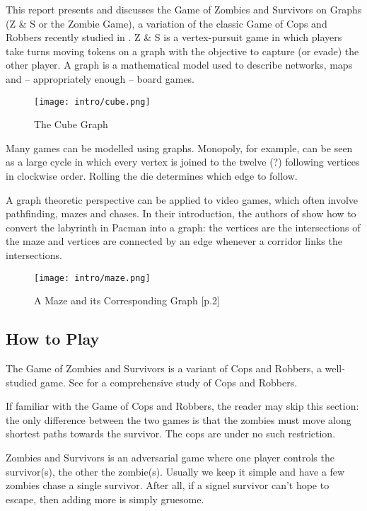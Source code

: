 
This report presents and discusses the Game of Zombies and Survivors on Graphs (Z \& S or the Zombie Game), a variation
of the classic Game of Cops and Robbers recently studied in \cite{fitzpatrick2016deterministic}.
Z \& S is a vertex-pursuit game in which players take turns moving tokens on a graph with
the objective to capture (or evade) the other player.
A graph is a mathematical model used to describe networks, maps and -- appropriately enough -- board games.

\begin{figure}[h!]
\centering
\texttt{[image: intro/cube.png]}
\caption{The Cube Graph} \label{fig:Cube}
\end{figure}

Many games can be modelled using graphs. Monopoly, for example, can be seen as a large cycle in which every vertex is joined to the twelve (?) following vertices in clockwise order. Rolling the die determines which edge to follow.

A graph theoretic perspective can be applied to video games, which often involve pathfinding, mazes and chases.
In their introduction, the authors of \cite{bonato2011game} show how to convert the labyrinth in Pacman into a graph:
the vertices are the intersections of the maze and vertices are connected by an edge whenever a corridor links the intersections.

\begin{figure}[h!]
\centering
\texttt{[image: intro/maze.png]}
\caption{A Maze and its Corresponding Graph \cite{bonato2011game}[p.2]} \label{fig:BonatoMazeGraph}
\end{figure}

\subsection{How to Play}

The Game of Zombies and Survivors is a variant of Cops and Robbers,
a well-studied game. See \cite{bonato2011game} for a comprehensive study of Cops
and Robbers.

If familiar with the Game of Cops and Robbers, the reader may skip this section:
the only difference between the two games is that the zombies must move
along shortest paths towards the survivor. The cops are under no such restriction.

Zombies and Survivors is an adversarial game where one player controls the survivor(s),
the other the zombie(s).
Usually we keep it simple and have a few zombies chase a single survivor. After all,
if a signel survivor can't hope to escape, then adding more is simply gruesome.

